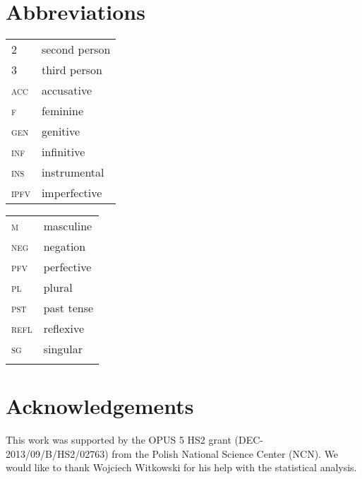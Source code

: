 \documentclass[output=paper]{langscibook}
\begin{document}
\section*{Abbreviations}

\begin{tabularx}{.5\textwidth}{@{}lX@{}}
\textsc{2}&second person\\
\textsc{3}&{third person}\\
\textsc{acc}&{accusative}\\
\textsc{f}&{feminine}\\
\textsc{gen}&{genitive}\\
\textsc{inf}&{infinitive}\\
\textsc{ins}&{instrumental}\\
\textsc{ipfv}&{imperfective}\\
\end{tabularx}%
\begin{tabularx}{.5\textwidth}{@{}lX@{}}
\textsc{m}&{masculine}\\
\textsc{neg}&{negation}\\
\textsc{pfv}&{perfective}\\
\textsc{pl}&{plural}\\
\textsc{pst}&{past tense}\\
\textsc{refl}&{reflexive}\\
\textsc{sg}&{singular}\\
\\
\end{tabularx}

\section*{Acknowledgements}

This work was supported by the OPUS 5 HS2 grant (DEC-2013/09/B/HS2/02763) from the Polish National Science Center (NCN). We would like to thank Wojciech Witkowski for his help with the statistical analysis.
\end{document}
